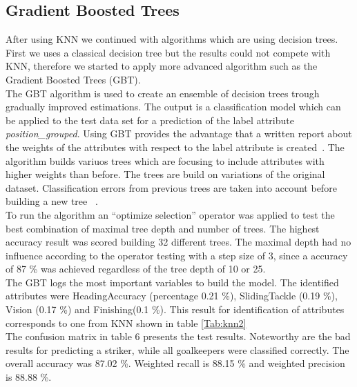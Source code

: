 \subsection{Gradient Boosted Trees}
After using KNN we continued with algorithms which are using decision trees. First we uses a classical decision tree but the results could not compete with KNN, therefore we started to apply more advanced algorithm such as the Gradient Boosted Trees (GBT).\\
The GBT algorithm is used to create an ensemble of decision trees trough gradually improved estimations. The output is a classification model which can be applied to the test data set for a prediction of the label attribute\textit{ position\_grouped}. Using GBT provides the advantage that a written report about the weights of the attributes with respect to the label attribute is created~\cite{ref_rapidminergbt}. The algorithm builds variuos trees which are focusing to include attributes with higher weights than before. The trees are build on variations of the original dataset. Classification errors from previous trees are taken into account before building a new tree ~\cite{ref_towardsGBT}.\\
To run the algorithm an ``optimize selection'' operator was applied to test the best combination of maximal tree depth and number of trees.  The highest accuracy result was scored building 32 different trees. The maximal depth had no influence according to the operator testing with a step size of 3, since a accuracy of 87 \% was achieved regardless of the tree depth of 10 or 25.\\
The GBT logs the most important variables to build the model. The identified attributes were HeadingAccuracy (percentage 0.21 \%), SlidingTackle (0.19 \%), Vision (0.17 \%) and Finishing(0.1 \%). This result for identification of attributes corresponds to one from KNN shown in table \ref{Tab:knn2}\\
The confusion matrix in table 6 presents the test results. Noteworthy are the bad results for predicting a striker, while all goalkeepers were classified correctly. The overall accuracy was 87.02 \%. Weighted recall is 88.15 \% and weighted precision is 88.88 \%. \\
